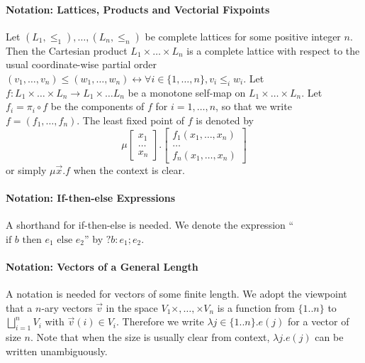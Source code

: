 \paragraph*{Notation: Lattices, Products and Vectorial Fixpoints}
\label{subsec:notation}
Let $(L_1,\leq_1),\dots,(L_n,\leq_n)$ be complete lattices for some positive integer $n$. Then the Cartesian product $L_1\times \dots\times L_n$ is a complete lattice with respect to the usual coordinate-wise partial order $(v_1,\dots,v_n) \leq (w_1,\dots,w_n) \leftrightarrow \forall i\in \{1, \dots,n\}, v_i \leq_i w_i$. Let $f:L_1\times \dots \times L_n\rightarrow L_1\times\dots L_n$ be a monotone self-map on $L_1\times \dots \times L_n$. Let $f_i = \pi_i \circ f$ be the components of $f$ for $i=1,\dots,n$, so that we write $f = (f_1,\dots,f_n)$. The least fixed point of $f$ is denoted by
\begin{equation*}
    \mu \begin{bmatrix}
        x_1 \\
        \dots \\
        x_n
    \end{bmatrix}. \begin{bmatrix}
        f_1 (x_1,\dots,x_n) \\
        \dots \\
        f_n (x_1,\dots,x_n)
    \end{bmatrix}
\end{equation*}
or simply $\mu\vec{x}.f$ when the context is clear.

\paragraph*{Notation: If-then-else Expressions}

A shorthand for if-then-else is needed. We denote the expression
``$\text{if }b \text{ then } e_1 \text{ else } e_2$'' by $?b: e_1 ; e_2$.

\paragraph*{Notation: Vectors of a General Length}

A notation is needed for vectors of some finite length. We adopt the viewpoint that a $n$-ary vectors $\vec{v}$ in the space $V_1\times,\dots,\times V_n$ is a function from $\{1..n\}$ to $\bigsqcup_{i=1}^n V_i$ with $\vec{v}(i)\in V_i$. Therefore we write $\lambda j\in\{1.. n\}. e(j)$ for a vector of size $n$. Note that when the size is usually clear from context, $\lambda j. e(j)$ can be written unambiguously.

